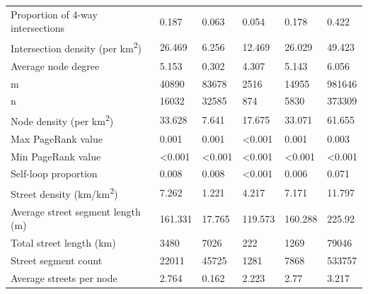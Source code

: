 \documentclass{article}
\begin{document}
\begin{table}
\begin{tabular}{llllll}
	Proportion of 4-way intersections           & 0.187          & 0.063          & 0.054          & 0.178          & 0.422          \\
	Intersection density (per km\textsuperscript{2})              & 26.469         & 6.256          & 12.469         & 26.029         & 49.423         \\
	Average node degree                         & 5.153          & 0.302          & 4.307          & 5.143          & 6.056          \\
	m                                           & 40890          & 83678          & 2516           & 14955          & 981646         \\
	n                                           & 16032          & 32585          & 874            & 5830           & 373309         \\
	Node density (per km\textsuperscript{2})                      & 33.628         & 7.641          & 17.675         & 33.071         & 61.655         \\
	Max PageRank value                          & 0.001          & 0.001          & \textless0.001 & 0.001          & 0.003          \\
	Min PageRank value                          & \textless0.001 & \textless0.001 & \textless0.001 & \textless0.001 & \textless0.001 \\
	Self-loop proportion                        & 0.008          & 0.008          & \textless0.001 & 0.006          & 0.071          \\
	Street density (km/km\textsuperscript{2})                     & 7.262          & 1.221          & 4.217          & 7.171          & 11.797         \\
	Average street segment length (m)           & 161.331        & 17.765         & 119.573        & 160.288        & 225.92         \\
	Total street length (km)                    & 3480           & 7026           & 222            & 1269           & 79046          \\
	Street segment count                        & 22011          & 45725          & 1281           & 7868           & 533757         \\
	Average streets per node                    & 2.764          & 0.162          & 2.223          & 2.77           & 3.217          \\
	\bottomrule
\end{tabular}
\end{table}
\end{document}
